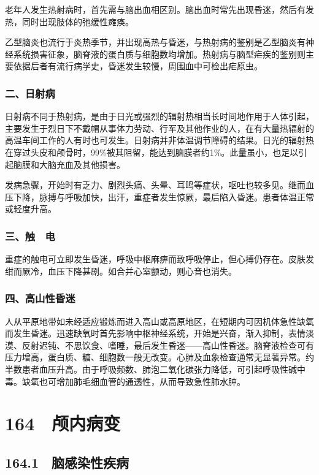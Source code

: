 老年人发生热射病时，首先需与脑出血相区别。脑出血时常先出现昏迷，然后有发热，同时出现肢体的弛缓性瘫痪。

乙型脑炎也流行于炎热季节，并出现高热与昏迷，与热射病的鉴别是乙型脑炎有神经系统损害征象，脑脊液的蛋白质与细胞数均增加。热射病与脑型疟疾的鉴别则主要依据后者有流行病学史，昏迷发生较慢，周围血中可检出疟原虫。

\subsubsection{二、日射病}

日射病不同于热射病，是由于日光或强烈的辐射热相当长时间地作用于人体引起，主要发生于烈日下不戴帽从事体力劳动、行军及其他作业的人，在有大量热辐射的高温车间工作的人有时也可发生。日射病并非体温调节障碍的结果。日光的辐射热在穿过头皮和颅骨时，99\%被其阻留，能达到脑膜者约1\%。此量虽小，也足以引起脑膜和大脑充血及其他损害。

发病急骤，开始时有乏力、剧烈头痛、头晕、耳鸣等症状，呕吐也较多见。继而血压下降，脉搏与呼吸加快，出汗，重症者发生惊厥，最后陷入昏迷。患者体温正常或轻度升高。

\subsubsection{三、触　电}

重症的触电可立即发生昏迷，呼吸中枢麻痹而致呼吸停止，但心搏仍存在。皮肤发绀而厥冷，血压下降甚剧。如合并心室颤动，则心音也消失。

\subsubsection{四、高山性昏迷}

人从平原地带如未经适应锻炼而进入高山或高原地区，在短期内可因机体急性缺氧而发生昏迷。迅速缺氧时首先影响中枢神经系统，开始是兴奋，渐入抑制，表情淡漠、反射迟钝、不思饮食、嗜睡，最后发生昏迷------高山性昏迷。脑脊液检查可有压力增高，蛋白质、糖、细胞数一般无改变。心肺及血象检查通常无显著异常。约半数患者血压升高。由于呼吸频数、肺泡二氧化碳张力降低，可引起呼吸性碱中毒。缺氧也可增加肺毛细血管的通透性，从而导致急性肺水肿。

\protect\hypertarget{text00375.html}{}{}

\section{164　颅内病变}

\subsection{164.1　脑感染性疾病}


